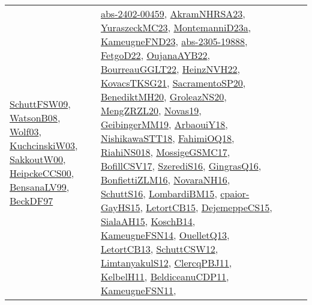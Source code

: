 {\begin{longtable}{lp{3cm}>{\raggedright}p{6cm}>{\raggedright}p{6cm}p{8cm}}
\href{papers/SchuttFSW09.pdf}{SchuttFSW09}\cite{SchuttFSW09}, \href{papers/WatsonB08.pdf}{WatsonB08}\cite{WatsonB08}, \href{papers/Wolf03.pdf}{Wolf03}\cite{Wolf03}, \href{articles/KuchcinskiW03.pdf}{KuchcinskiW03}\cite{KuchcinskiW03}, \href{articles/SakkoutW00.pdf}{SakkoutW00}\cite{SakkoutW00}, \href{articles/HeipckeCCS00.pdf}{HeipckeCCS00}\cite{HeipckeCCS00}, \href{articles/BensanaLV99.pdf}{BensanaLV99}\cite{BensanaLV99}, \href{papers/BeckDF97.pdf}{BeckDF97}\cite{BeckDF97} & \href{articles/abs-2402-00459.pdf}{abs-2402-00459}\cite{abs-2402-00459}, \href{articles/AkramNHRSA23.pdf}{AkramNHRSA23}\cite{AkramNHRSA23}, \href{papers/YuraszeckMC23.pdf}{YuraszeckMC23}\cite{YuraszeckMC23}, \href{articles/MontemanniD23a.pdf}{MontemanniD23a}\cite{MontemanniD23a}, \href{papers/KameugneFND23.pdf}{KameugneFND23}\cite{KameugneFND23}, \href{articles/abs-2305-19888.pdf}{abs-2305-19888}\cite{abs-2305-19888}, \href{articles/FetgoD22.pdf}{FetgoD22}\cite{FetgoD22}, \href{papers/OujanaAYB22.pdf}{OujanaAYB22}\cite{OujanaAYB22}, \href{articles/BourreauGGLT22.pdf}{BourreauGGLT22}\cite{BourreauGGLT22}, \href{articles/HeinzNVH22.pdf}{HeinzNVH22}\cite{HeinzNVH22}, \href{papers/KovacsTKSG21.pdf}{KovacsTKSG21}\cite{KovacsTKSG21}, \href{articles/SacramentoSP20.pdf}{SacramentoSP20}\cite{SacramentoSP20}, \href{articles/BenediktMH20.pdf}{BenediktMH20}\cite{BenediktMH20}, \href{papers/GroleazNS20.pdf}{GroleazNS20}\cite{GroleazNS20}, \href{articles/MengZRZL20.pdf}{MengZRZL20}\cite{MengZRZL20}, \href{articles/Novas19.pdf}{Novas19}\cite{Novas19}, \href{papers/GeibingerMM19.pdf}{GeibingerMM19}\cite{GeibingerMM19}, \href{papers/ArbaouiY18.pdf}{ArbaouiY18}\cite{ArbaouiY18}, \href{papers/NishikawaSTT18.pdf}{NishikawaSTT18}\cite{NishikawaSTT18}, \href{articles/FahimiOQ18.pdf}{FahimiOQ18}\cite{FahimiOQ18}, \href{papers/RiahiNS018.pdf}{RiahiNS018}\cite{RiahiNS018}, \href{papers/MossigeGSMC17.pdf}{MossigeGSMC17}\cite{MossigeGSMC17}, \href{papers/BofillCSV17.pdf}{BofillCSV17}\cite{BofillCSV17}, \href{papers/SzerediS16.pdf}{SzerediS16}\cite{SzerediS16}, \href{papers/GingrasQ16.pdf}{GingrasQ16}\cite{GingrasQ16}, \href{papers/BonfiettiZLM16.pdf}{BonfiettiZLM16}\cite{BonfiettiZLM16}, \href{articles/NovaraNH16.pdf}{NovaraNH16}\cite{NovaraNH16}, \href{papers/SchuttS16.pdf}{SchuttS16}\cite{SchuttS16}, \href{papers/LombardiBM15.pdf}{LombardiBM15}\cite{LombardiBM15}, \href{papers/cpaior-GayHS15.pdf}{cpaior-GayHS15}\cite{cpaior-GayHS15}, \href{articles/LetortCB15.pdf}{LetortCB15}\cite{LetortCB15}, \href{papers/DejemeppeCS15.pdf}{DejemeppeCS15}\cite{DejemeppeCS15}, \href{papers/SialaAH15.pdf}{SialaAH15}\cite{SialaAH15}, \href{papers/KoschB14.pdf}{KoschB14}\cite{KoschB14}, \href{articles/KameugneFSN14.pdf}{KameugneFSN14}\cite{KameugneFSN14}, \href{papers/OuelletQ13.pdf}{OuelletQ13}\cite{OuelletQ13}, \href{papers/LetortCB13.pdf}{LetortCB13}\cite{LetortCB13}, \href{papers/SchuttCSW12.pdf}{SchuttCSW12}\cite{SchuttCSW12}, \href{articles/LimtanyakulS12.pdf}{LimtanyakulS12}\cite{LimtanyakulS12}, \href{papers/ClercqPBJ11.pdf}{ClercqPBJ11}\cite{ClercqPBJ11}, \href{articles/KelbelH11.pdf}{KelbelH11}\cite{KelbelH11}, \href{articles/BeldiceanuCDP11.pdf}{BeldiceanuCDP11}\cite{BeldiceanuCDP11}, \href{papers/KameugneFSN11.pdf}{KameugneFSN11}\cite{KameugneFSN11}, 
\end{longtable}}
